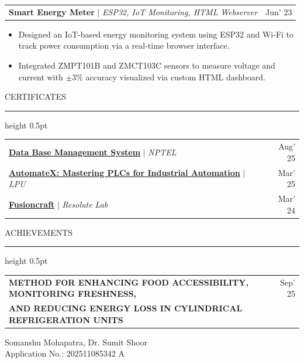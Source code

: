 \documentclass[10pt,a4paper]{article}
\newcommand{\resumeheading}[1]{
    \vspace{6pt}
    {\large\color{resblue} #1}
    \vspace{1pt}
    {\color{resblue}\hrule height 0.5pt}
    \vspace{4pt}
}
\begin{document}
\vspace{2pt}

\begin{tabularx}{\textwidth}{@{}X r@{}}
\textbf{\color{resblue} Smart Energy Meter} $|$ \textit{ESP32, IoT Monitoring, HTML Webserver} & Jun' 23
\end{tabularx}
\begin{itemize}[leftmargin=1.5em, itemsep=0pt, parsep=1pt, topsep=2pt]
    \item Designed an IoT-based energy monitoring system using ESP32 and Wi-Fi to track power consumption via a real-time browser interface.
    \item Integrated ZMPT101B and ZMCT103C sensors to measure voltage and current with $\pm$3\% accuracy visualized via custom HTML dashboard.
\end{itemize}

\resumeheading{CERTIFICATES}

\begin{tabularx}{\textwidth}{@{}X r@{}}
\textbf{\color{resblue} \href{https://drive.google.com/file/d/1cPZTNh-I-6y_1j0XR1dyLbr4Padv7GvN/view?usp=drive_link}{Data Base Management System}} $|$ \textit{NPTEL} & Aug' 25 \\[1.5pt]
\textbf{\color{resblue} \href{https://drive.google.com/file/d/1PUqcvq8SkgS4APbpqYSwzsYsXNxvOywR/view?usp=drive_link}{AutomateX: Mastering PLCs for Industrial Automation}} $|$ \textit{LPU} & Mar' 25 \\[1.5pt]
\textbf{\color{resblue} \href{https://drive.google.com/file/d/16txdJfMjoQ9aB_c2yHVEDFoT7vu3QOEp/view?usp=drive_link}{Fusioncraft}} $|$ \textit{Resolute Lab} & Mar' 24
\end{tabularx}

\resumeheading{ACHIEVEMENTS}

\begin{tabularx}{\textwidth}{@{}X r@{}}
\textbf{\color{resblue} METHOD FOR ENHANCING FOOD ACCESSIBILITY, MONITORING FRESHNESS,} & Sep' 25 \\
\textbf{\color{resblue} AND REDUCING ENERGY LOSS IN CYLINDRICAL REFRIGERATION UNITS} & 
\end{tabularx}
Somanshu Mohapatra, Dr. Sumit Shoor \\
Application No.: 202511085342 A
\end{document}
